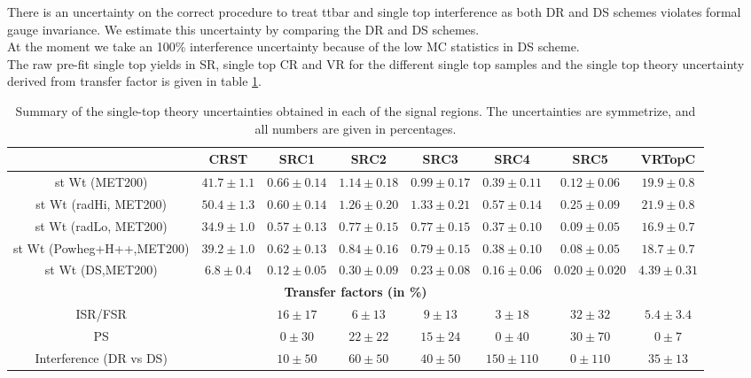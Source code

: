 \indent There is an uncertainty on the correct procedure to treat ttbar and single top interference as both DR and DS schemes violates formal gauge invariance.  We estimate this uncertainty by comparing the DR and DS schemes.  \\

\indent At the moment we take an 100\% interference uncertainty because of the low MC statistics in DS scheme. \\

\indent The raw pre-fit single top yields in SR, single top CR and VR for the different single top samples and the single top theory uncertainty derived from transfer factor is given in table \ref{tab:single_top_unc3}. \\

   \begin{table}[!h]
    \begin{center} \footnotesize
        \begin{tabular}{|c|c|c|c|c|c|c|c|}
        \hline
        & CRST  & SRC1 & SRC2 & SRC3 & SRC4 & SRC5 & VRTopC\\ \hline
          \hline
          st Wt (MET200)&          $41.7\pm 1.1$&          $0.66\pm 0.14$&         $1.14\pm 0.18$&         $0.99\pm 0.17$&         $0.39\pm 0.11$&         $0.12\pm 0.06$&         $19.9\pm 0.8$\\
          st Wt (radHi, MET200)&   $50.4\pm 1.3$&          $0.60\pm 0.14$&         $1.26\pm 0.20$&         $1.33\pm 0.21$&         $0.57\pm 0.14$&         $0.25\pm 0.09$&         $21.9\pm 0.8$\\
st Wt (radLo, MET200)&   $34.9\pm 1.0$&          $0.57\pm 0.13$&         $0.77\pm 0.15$&         $0.77\pm 0.15$&         $0.37\pm 0.10$&         $0.09\pm 0.05$&         $16.9\pm 0.7$\\
st Wt (Powheg+H++,MET200)&       $39.2\pm 1.0$&          $0.62\pm 0.13$&         $0.84\pm 0.16$&         $0.79\pm 0.15$&         $0.38\pm 0.10$&         $0.08\pm 0.05$&         $18.7\pm 0.7$\\
st Wt (DS,MET200)&       $6.8\pm 0.4$&   $0.12\pm 0.05$&         $0.30\pm 0.09$&         $0.23\pm 0.08$&         $0.16\pm 0.06$&         $0.020\pm 0.020$&       $4.39\pm 0.31$\\
          \hline \hline 
          \multicolumn{8}{c}{\bf Transfer factors (in \%)} \\ \hline
          ISR/FSR& &       $16\pm17$&      $6\pm13$&       $9\pm13$&       $3\pm18$&       $32\pm32$&      $5.4\pm3.4$\\
          PS &   &     $0\pm30$&       $22\pm22$&      $15\pm24$&      $0\pm40$&       $30\pm70$&      $0\pm7$\\
          Interference (DR vs DS) &  &      $10\pm50$&      $60\pm50$&      $40\pm50$&      $150\pm110$&    $0\pm110$&      $35\pm13$\\
          \hline
        \end{tabular}
    \end{center}
    \caption{Summary of the single-top theory uncertainties obtained in each of the signal regions. The uncertainties are symmetrize, and all numbers are given in percentages.}
    \label{tab:single_top_unc3}
  \end{table}

